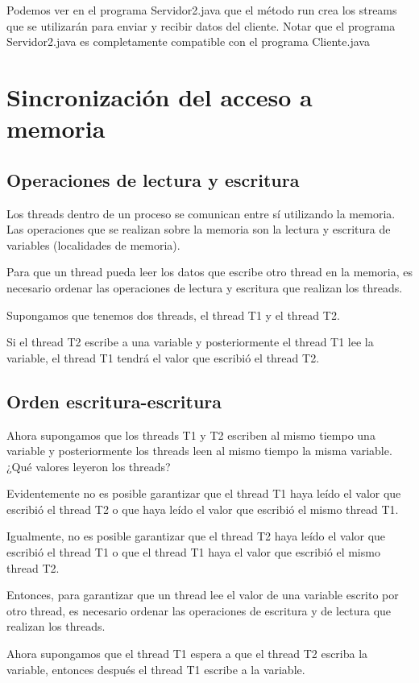 \documentclass[11pt,a4paper,oneside]{book}
\begin{document}
Podemos ver en el programa Servidor2.java que el método run crea los streams que se utilizarán para enviar y recibir datos del cliente. Notar que el programa Servidor2.java es completamente compatible con el programa Cliente.java

\chapter{Sincronización del acceso a memoria}

\section{Operaciones de lectura y escritura}

Los threads dentro de un proceso se comunican entre sí utilizando la memoria. Las operaciones que se realizan sobre la memoria son la lectura y escritura de variables (localidades de memoria).

Para que un thread pueda leer los datos que escribe otro thread en la memoria, es necesario ordenar las operaciones de lectura y escritura que realizan los threads.

Supongamos que tenemos dos threads, el thread T1 y el thread T2.

Si el thread T2 escribe a una variable y posteriormente el thread T1 lee la variable, el thread T1 tendrá el valor que escribió el thread T2.

\section{Orden escritura-escritura}

Ahora supongamos que los threads T1 y T2 escriben al mismo tiempo una variable y posteriormente los threads leen al mismo tiempo la misma variable. ¿Qué valores leyeron los threads?

Evidentemente no es posible garantizar que el thread T1 haya leído el valor que escribió el thread T2 o que haya leído el valor que escribió el mismo thread T1. 

Igualmente, no es posible garantizar que el thread T2 haya leído el valor que escribió el thread T1 o que el thread T1 haya el valor que escribió el mismo thread T2.

Entonces, para garantizar que un thread lee el valor de una variable escrito por otro thread, es necesario ordenar las operaciones de escritura y de lectura que realizan los threads.

Ahora supongamos que el thread T1 espera a que el thread T2 escriba la variable, entonces después el thread T1 escribe a la variable.
\end{document}
